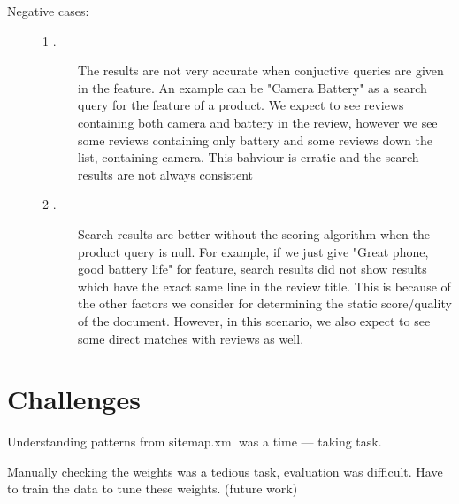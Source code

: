 \documentclass{article}
\begin{document}
	\begin{description}
		\item[Negative cases:] 
			\begin{description}
				\item[1 .] The results are not very accurate when conjuctive queries are given in the feature. An example can be "Camera Battery" as a search query for the feature of a product. We expect to see reviews containing both camera and battery in the review, however we see some reviews containing only battery and some reviews down the list, containing camera. This bahviour is erratic and the search results are not always consistent
				\item[2 .] Search results are better without the scoring algorithm when the product query is null. For example, if we just give "Great phone, good battery life" for feature, search results did not show results which have the exact same line in the review title. This is because of the other factors we consider for determining the static score/quality of the document. However, in this scenario, we also expect to see some direct matches with reviews as well. 
			\end{description}
	\end{description}

\section{Challenges}
\begin{description}
\item Understanding patterns from sitemap.xml was a time --- taking task.
\item Manually checking the weights was a tedious task, evaluation was difficult. Have to train the data to tune these weights. (future work)
\end{description}
\end{document}
